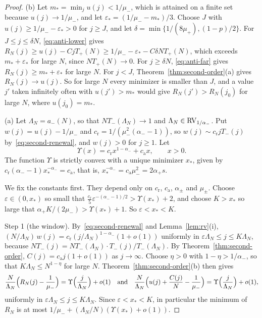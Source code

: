 \begin{proof}
(b) Let $m_*=\min_ju(j)<1/\mu_\minus$, which is attained on a finite set because
$u(j)\to1/\mu_\minus$, and let $\varepsilon_*=(1/\mu_\minus-m_*)/3$. Choose $J$ with
$u(j)\ge1/\mu_\minus-\varepsilon_*>0$ for $j\ge J$, and let $\delta=\min\{1/(8\mu_\plus),(1-p)/2\}$. For
$J\le j\le\delta N$, \eqref{eq:anti-lower} gives
$R_N(j)\ge u(j)-CjT_\plus(N)\ge1/\mu_\minus-\varepsilon_*-C\delta NT_\plus(N)$, which exceeds
$m_*+\varepsilon_*$ for large $N$, since $NT_\plus(N)\to0$. For $j\ge\delta N$,
\eqref{eq:anti-far} gives $R_N(j)\ge m_*+\varepsilon_*$ for large $N$. For $j<J$,
Theorem~\ref{thm:second-order}(a) gives $R_N(j)\to u(j)$. So for large $N$ every
minimizer is smaller than $J$, and a value $j'$ taken infinitely often with
$u(j')>m_*$ would give $R_N(j')>R_N(j_0)$ for large $N$, where $u(j_0)=m_*$.

(a) Let $\Lambda_N=a_\minus(N)$, so that $NT_\minus(\Lambda_N)\to1$ and
$\Lambda_N\in\mathrm{RV}_{1/\alpha_{-}}$. Put $w(j)=u(j)-1/\mu_\minus$ and
$c_{\mathrm r}=1/(\mu_\minus^2(\alpha_\minus-1))$, so $w(j)\sim c_{\mathrm r}jT_\minus(j)$
by~\eqref{eq:second-renewal}, and $w(j)>0$ for $j\ge1$. Let
\[
 \Upsilon(x)=c_{\mathrm r}x^{1-\alpha_\minus}+c_{\mathrm a}x,\qquad x>0 .
\]
The function $\Upsilon$ is strictly convex with a unique minimizer $x_*$, given by
$c_{\mathrm r}(\alpha_\minus-1)x_*^{-\alpha_\minus}=c_{\mathrm a}$, that is,
$x_*^{-\alpha_\minus}=c_{\mathrm a}\mu_\minus^2=2\alpha_\plus s$.

We fix the constants first. They depend only on $c_{\mathrm r}$, $c_{\mathrm a}$, $\alpha_\pm$ and
$\mu_\pm$. Choose $\varepsilon\in(0,x_*)$ so small that
$\frac{c_{\mathrm r}}5\varepsilon^{-(\alpha_\minus-1)/2}>\Upsilon(x_*)+2$, and choose $K>x_*$ so large
that $\alpha_\plus K/(2\mu_\minus)>\Upsilon(x_*)+1$. So $\varepsilon<x_*<K$.

Step 1 (the window). By~\eqref{eq:second-renewal} and
Lemma~\ref{lem:rv}(i),
$(N/\Lambda_N)\,w(j)=c_{\mathrm r}(j/\Lambda_N)^{1-\alpha_\minus}(1+o(1))$ uniformly in
$\varepsilon\Lambda_N\le j\le K\Lambda_N$, because
$NT_\minus(j)=NT_\minus(\Lambda_N)\cdot T_\minus(j)/T_\minus(\Lambda_N)$. By
Theorem~\ref{thm:second-order}, $C(j)=c_{\mathrm a}j(1+o(1))$ as $j\to\infty$. Choose
$\eta>0$ with $1-\eta>1/\alpha_\minus$, so that $K\Lambda_N\le N^{1-\eta}$ for large
$N$. Theorem~\ref{thm:second-order}(b) then gives
\begin{equation}\label{eq:anti-window}
 \frac{N}{\Lambda_N}\Bigl(R_N(j)-\frac1{\mu_{-}}\Bigr)=\Upsilon\Bigl(\frac{j}{\Lambda_N}\Bigr)+o(1)
 \quad\text{and}\quad
 \frac{N}{\Lambda_N}\Bigl(u(j)+\frac{C(j)}N-\frac1{\mu_{-}}\Bigr)=\Upsilon\Bigl(\frac{j}{\Lambda_N}\Bigr)+o(1),
\end{equation}
uniformly in $\varepsilon\Lambda_N\le j\le K\Lambda_N$. Since $\varepsilon<x_*<K$, in
particular the minimum of $R_N$ is at most $1/\mu_\minus+(\Lambda_N/N)(\Upsilon(x_*)+o(1))$.


\end{proof}
